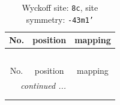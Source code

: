 \documentclass[fleqn,8pt]{jsarticle}
\begin{document}
\renewcommand{\arraystretch}{1.2}
\begin{longtable}{ccc}
\caption{Wyckoff site: {\tt 8c}, site symmetry: {\tt -43m1'}}
 \\
 \hline \hline
No. & position & mapping \\ \hline \endfirsthead

\multicolumn{2}{l}{\tablename\ \thetable{}} \\
 \hline \hline
No. & position & mapping \\ \hline \endhead

 \hline \hline
\multicolumn{2}{r}{\footnotesize\it continued ...} \\ \endfoot

 \hline \hline
\multicolumn{2}{r}{} \\ \endlastfoot


\end{longtable}
\end{document}
